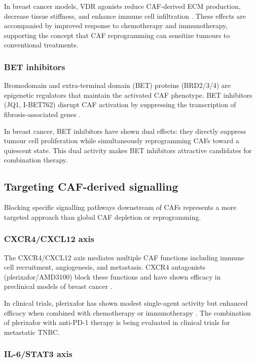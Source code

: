 In breast cancer models, VDR agonists reduce CAF-derived ECM production, decrease tissue stiffness, and enhance immune cell infiltration \citep{shen2023}. These effects are accompanied by improved response to chemotherapy and immunotherapy, supporting the concept that CAF reprogramming can sensitize tumours to conventional treatments.

\subsubsection{BET inhibitors}

Bromodomain and extra-terminal domain (BET) proteins (BRD2/3/4) are epigenetic regulators that maintain the activated CAF phenotype. BET inhibitors (JQ1, I-BET762) disrupt CAF activation by suppressing the transcription of fibrosis-associated genes \citep{erve2024}.

In breast cancer, BET inhibitors have shown dual effects: they directly suppress tumour cell proliferation while simultaneously reprogramming CAFs toward a quiescent state. This dual activity makes BET inhibitors attractive candidates for combination therapy.

\subsection{Targeting CAF-derived signalling}

Blocking specific signalling pathways downstream of CAFs represents a more targeted approach than global CAF depletion or reprogramming.

\subsubsection{CXCR4/CXCL12 axis}

The CXCR4/CXCL12 axis mediates multiple CAF functions including immune cell recruitment, angiogenesis, and metastasis. CXCR4 antagonists (plerixafor/AMD3100) block these functions and have shown efficacy in preclinical models of breast cancer \citep{domanska2012}.

In clinical trials, plerixafor has shown modest single-agent activity but enhanced efficacy when combined with chemotherapy or immunotherapy \citep{domanska2012}. The combination of plerixafor with anti-PD-1 therapy is being evaluated in clinical trials for metastatic TNBC.

\subsubsection{IL-6/STAT3 axis}

